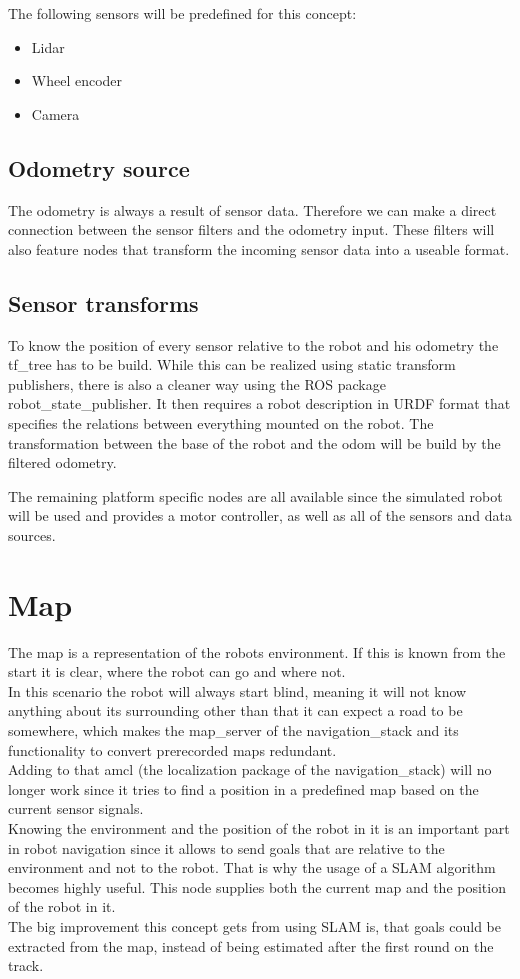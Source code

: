 The following sensors will be predefined for this concept:

\begin{itemize}
	\item Lidar
	\item Wheel encoder
	\item Camera
\end{itemize}


\subsection{Odometry source}
The odometry is always a result of sensor data. Therefore we can make a direct connection between the sensor filters and the odometry input. These filters will also feature nodes that transform the incoming sensor data into a useable format.

\subsection{Sensor transforms}
To know the position of every sensor relative to the robot and his odometry the tf\_tree has to be build. While this can be realized using static transform publishers, there is also a cleaner way using the ROS package robot\_state\_publisher. It then requires a robot description in URDF format that specifies the relations between everything mounted on the robot.
The transformation between the base of the robot and the odom will be build by the filtered odometry.

The remaining platform specific nodes are all available since the simulated robot will be used and provides a motor controller, as well as all of the sensors and data sources.

\section{Map}

The map is a representation of the robots environment. If this is known from the start it is clear, where the robot can go and where not.\\
 In this scenario the robot will always start blind, meaning it will not know anything about its surrounding other than that it can expect a road to be somewhere, which makes the map\_server of the navigation\_stack and its functionality to convert prerecorded maps redundant.\\
Adding to that amcl (the localization package of the navigation\_stack) will no longer work since it tries to find a position in a predefined map based on the current sensor signals.\\
Knowing the environment and the position of the robot in it is an important part in robot navigation since it allows to send goals that are relative to the environment and not to the robot. That is why the usage of a SLAM algorithm becomes highly useful. This node supplies both the current map and the position of the robot in it.\\
The big improvement this concept gets from using SLAM is, that goals could be extracted from the map, instead of being estimated after the first round on the track.

